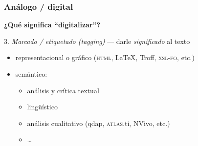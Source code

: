 \documentclass[%
  handout, %
  ]{beamer}
\newcommand*{\rojo}[1]{\textcolor[HTML]{8B0000}{#1}}
\newcommand*{\rojoit}[1]{\textit{\textcolor[HTML]{8B0000}{#1}}}
\newcommand{\Azul}{\color{bluenivaca}}
\begin{document}
\begin{frame}
  \frametitle{Análogo / digital}
  
  {\large\Azul\textbf{¿Qué significa \enquote{digitalizar}?}}

  \bigskip

  \rojo{3.} \rojoit{Marcado / etiquetado (\textit{tagging})} --- darle \textit{significado} al texto

  \begin{center}
    \begin{itemize}
      \item representacional o gráfico (\textsc{html}, \LaTeX, Troff, \textsc{xsl-fo}, etc.)
      \item semántico:
        \begin{itemize}
          \item análisis y crítica textual
          \item lingüístico
          \item análisis cualitativo (qdap, \textsc{atlas}.ti, NVivo, etc.)
          \item \dots
        \end{itemize}
    \end{itemize}
    
  \end{center}

\end{frame}






  




    
\end{document}
